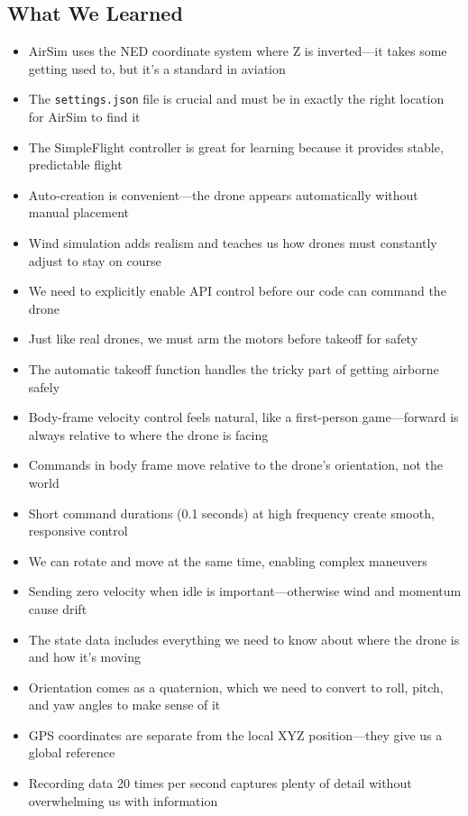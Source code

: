 \subsection{What We Learned}
\begin{itemize}
	\item AirSim uses the NED coordinate system where Z is inverted—it takes some getting used to, but it's a standard in aviation
	\item The \texttt{settings.json} file is crucial and must be in exactly the right location for AirSim to find it
	\item The SimpleFlight controller is great for learning because it provides stable, predictable flight
	\item Auto-creation is convenient—the drone appears automatically without manual placement
	\item Wind simulation adds realism and teaches us how drones must constantly adjust to stay on course
	\item We need to explicitly enable API control before our code can command the drone
	\item Just like real drones, we must arm the motors before takeoff for safety
	\item The automatic takeoff function handles the tricky part of getting airborne safely
	\item Body-frame velocity control feels natural, like a first-person game—forward is always relative to where the drone is facing
	\item Commands in body frame move relative to the drone's orientation, not the world
	\item Short command durations (0.1 seconds) at high frequency create smooth, responsive control
	\item We can rotate and move at the same time, enabling complex maneuvers
	\item Sending zero velocity when idle is important—otherwise wind and momentum cause drift
	\item The state data includes everything we need to know about where the drone is and how it's moving
	\item Orientation comes as a quaternion, which we need to convert to roll, pitch, and yaw angles to make sense of it
	\item GPS coordinates are separate from the local XYZ position—they give us a global reference
	\item Recording data 20 times per second captures plenty of detail without overwhelming us with information

\end{itemize}
